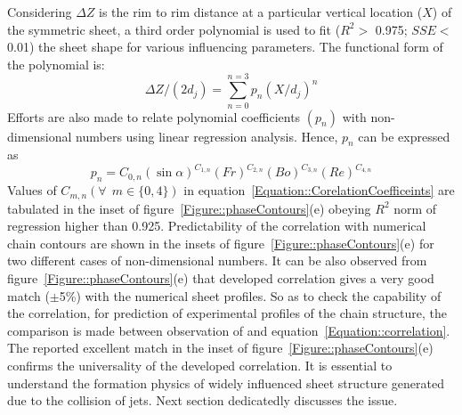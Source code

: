 \documentclass{jfm}
\begin{document}
Considering $\Delta Z$ is the rim to rim distance at a particular vertical location ($X$) of the symmetric sheet, a third order polynomial is used to fit ($R^2 >$ 0.975; $SSE <$ 0.01) the sheet shape for various influencing parameters. The functional form of the polynomial is: 
\begin{equation}\label{Equation::correlation}
\Delta Z/(2d_j) = \sum_{n = 0}^{n = 3}p_n(X/d_j)^n
\end{equation}
Efforts are also made to relate polynomial coefficients $\left(p_n\right)$ with non-dimensional numbers using linear regression analysis. Hence, $p_n$ can be expressed as
\begin{equation}\label{Equation::CorelationCoefficeints}
p_n = C_{0,n}\left(\sin\alpha\right)^{C_{1,n}}\left(Fr\right)^{C_{2,n}}\left(Bo\right)^{C_{3,n}}\left(Re\right)^{C_{4,n}}
\end{equation}
Values of $C_{m,n} \left(\forall\:\: m \in \{0,4\}\right)$ in equation~\ref{Equation::CorelationCoefficeints} are tabulated in the inset of figure~\ref{Figure::phaseContours}(e) obeying $R^2$ norm of regression higher than 0.925. Predictability of the correlation with numerical chain contours are shown in the insets of figure~\ref{Figure::phaseContours}(e) for two different cases of non-dimensional numbers. It can be also observed from figure~\ref{Figure::phaseContours}(e) that developed correlation gives a very good match ($\pm$5\%) with the numerical sheet profiles. So as to check the capability of the correlation, for prediction of experimental profiles of the chain structure, the comparison is made between observation of \cite{bush2004collision} and equation~\ref{Equation::correlation}. The reported excellent match in the inset of figure~\ref{Figure::phaseContours}(e) confirms the universality of the developed correlation. It is essential to understand the formation physics of widely influenced sheet structure generated due to the collision of jets. Next section dedicatedly discusses the issue.
\end{document}
